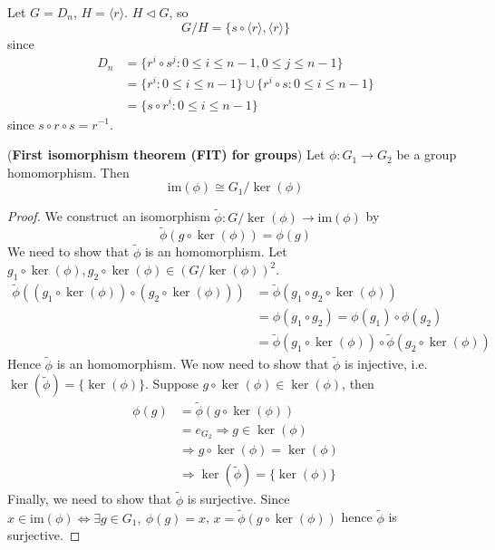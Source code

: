 \begin{example}\label{exa:quotientGroup3}
	Let $G = D_n$, $H = \langle r \rangle$. $H \triangleleft G$, so
	\[
		G / H = \{ s \circ \langle r \rangle, \langle r \rangle \}
	\]
	since
	\[
		\begin{aligned}
			D_n
				& = \{ r^i \circ s^j: 0 \le i \le n - 1, 0 \le j \le n - 1 \} \\
				& = \{ r^i: 0 \le i \le n - 1 \} \cup \{ r^i \circ s: 0 \le i \le n - 1 \} \\
				& = \{ s \circ r^i: 0 \le i \le n - 1 \}
		\end{aligned}
	\]
	since $s \circ r \circ s = r^{-1}$.
\end{example}

\begin{theorem}
	(\textbf{First isomorphism theorem (FIT) for groups}) Let $\phi: G_1 \rightarrow G_2$ be a group homomorphism. Then
	\[
		\text{im}(\phi) \cong G_1 / \ker(\phi)
	\]
\end{theorem}

\begin{proof}
	We construct an isomorphism $\tilde{\phi}: G / \ker(\phi) \rightarrow \text{im}(\phi)$ by
	\[
		\tilde{\phi}(g \circ \ker(\phi)) = \phi(g)
	\]
	We need to show that $\tilde{\phi}$ is an homomorphism. Let $g_1 \circ \ker(\phi), g_2 \circ \ker(\phi) \in {(G / \ker(\phi))}^2$.
	\[
		\begin{aligned}
			\tilde{\phi}((g_1 \circ \ker(\phi)) \circ (g_2 \circ \ker(\phi)))
				& = \tilde{\phi} (g_1 \circ g_2 \circ \ker(\phi)) \\
				& = \phi(g_1 \circ g_2) = \phi(g_1) \circ \phi(g_2) \\
				& = \tilde{\phi}(g_1 \circ \ker(\phi)) \circ \tilde{\phi}(g_2 \circ \ker(\phi))
		\end{aligned}
	\]
	Hence $\tilde{\phi}$ is an homomorphism. We now need to show that $\tilde{\phi}$ is injective, i.e. $\ker(\tilde{\phi}) = \{ \ker(\phi) \}$. Suppose $g \circ \ker(\phi) \in \ker(\phi)$, then
	\[
		\begin{aligned}
			\phi(g) & = \tilde{\phi}(g \circ \ker(\phi)) \\
			& = e_{G_2} \Longrightarrow g \in \ker(\phi) \\
			& \Longrightarrow g \circ \ker(\phi) = \ker(\phi) \\
			& \Longrightarrow \ker(\tilde{\phi}) = \{ \ker(\phi) \}
		\end{aligned}
	\]
	Finally, we need to show that $\tilde{\phi}$ is surjective. Since $x \in \text{im}(\phi) \Longleftrightarrow \exists g \in G_1, \ \phi(g) = x$, $x = \tilde{\phi}(g \circ \ker(\phi))$ hence $\tilde{\phi}$ is surjective.
\end{proof}


